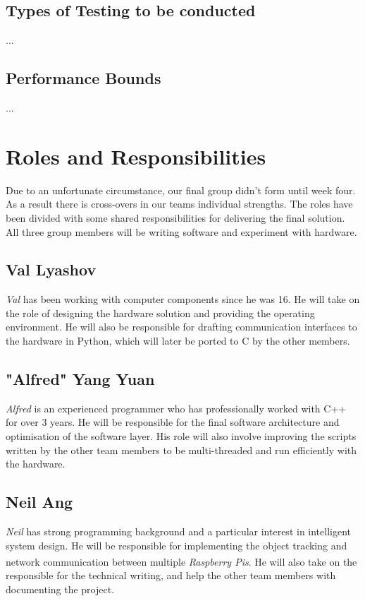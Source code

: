 \documentclass[11pt,a4paper,titlepage]{report}
\newcommand{\rpis}{\textit{Raspberry Pi\textsuperscript{\textregistered}s}}
\begin{document}
\subsection{Types of Testing to be conducted}

...

\subsection{Performance Bounds}

...




\section{Roles and Responsibilities}

Due to an unfortunate circumstance, our final group didn't form until week four. As a result there is cross-overs in our teams individual strengths. The roles have been divided with some shared responsibilities for delivering the final solution. All three group members will be writing software and experiment with hardware.


\subsection{Val Lyashov}
\textit{Val} has been working with computer components since he was 16. He will take on the role of designing the hardware solution and providing the operating environment. He will also be responsible for drafting communication interfaces to the hardware in Python, which will later be ported to C by the other members.


\subsection{"Alfred" Yang Yuan}
\textit{Alfred} is an experienced programmer who has professionally worked with C++ for over 3 years. He will be responsible for the final software architecture and optimisation of the software layer. His role will also involve improving the scripts written by the other team members to be multi-threaded and run efficiently with the hardware.

\subsection{Neil Ang}
\textit{Neil} has strong programming background and a particular interest in intelligent system design. He will be responsible for implementing the object tracking and network communication between multiple \rpis. He will also take on the responsible for the technical writing, and help the other team members with documenting the project. 




\nocite{*}
\printbibliography[heading=bibintoc]
\end{document}

